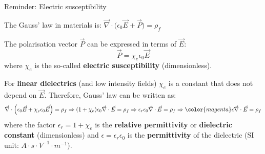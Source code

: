 {
\reminderslide

%
%
%

\begin{frame}{Reminder: Electric susceptibility}

The Gauss' law in materials is:
$\displaystyle \vec{\nabla} \cdot \Big( \epsilon_0 \vec{E} + \vec{P} \Big) = \rho_{f}$\\

\vspace{0.2cm}

The polarisation vector $\vec{P}$ can be expressed in terms of $\vec{E}$:
\begin{equation*}
  \vec{P} = \chi_e \epsilon_0 \vec{E}
\end{equation*}
where $\chi_e$ is the so-called {\bf electric susceptibility} (dimensionless).\\

\vspace{0.2cm}

For {\bf linear dielectrics} (and low intensity fields) $\chi_e$ is a
constant that does not depend on $\vec{E}$.
Therefore, Gauss' law can be written as:
\begin{equation*}
  \vec{\nabla} \cdot \Big( \epsilon_0 \vec{E} + \chi_e \epsilon_0 \vec{E} \Big) = \rho_{f} \Rightarrow
  (1+\chi_e) \epsilon_0 \vec{\nabla} \cdot \vec{E} = \rho_{f} \Rightarrow
  \epsilon_r \epsilon_0 \vec{\nabla} \cdot \vec{E} = \rho_{f} \Rightarrow
  {\color{magenta}
     \epsilon \vec{\nabla} \cdot \vec{E} =  \rho_{f}
  }
\end{equation*}
where the factor $\epsilon_r = 1+\chi_e$
is the {\bf relative permittivity} or {\bf dielectric constant} (dimensionless) and
$\epsilon = \epsilon_r  \epsilon_0$ is the {\bf permittivity} of the dielectric
(SI unit: $A \cdot s \cdot  V^{-1} \cdot m^{-1}$).\\

\end{frame}

} %

%
%
%

